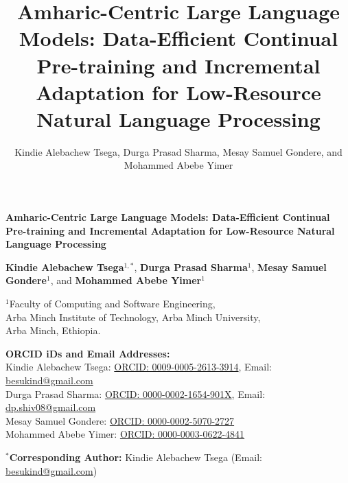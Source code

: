 \documentclass[11pt,a4paper]{article}
\title{Amharic-Centric Large Language Models: Data-Efficient Continual Pre-training and Incremental Adaptation for Low-Resource Natural Language Processing}
\author{Kindie Alebachew Tsega, Durga Prasad Sharma, Mesay Samuel Gondere, and Mohammed Abebe Yimer}
\date{}
\begin{document}
\begin{center}
    {\LARGE\bfseries Amharic-Centric Large Language Models: Data-Efficient Continual Pre-training and Incremental Adaptation for Low-Resource Natural Language Processing\par}
    
    \vspace{1.5em}
    
    {\large
    \textbf{Kindie Alebachew Tsega}$^{1,*}$, 
    \textbf{Durga Prasad Sharma}$^{1}$, 
    \textbf{Mesay Samuel Gondere}$^{1}$, and 
    \textbf{Mohammed Abebe Yimer}$^{1}$\par}
    
    \vspace{0.8em}
    
    {\normalsize
    $^{1}$Faculty of Computing and Software Engineering,\\
    Arba Minch Institute of Technology, Arba Minch University,\\
    Arba Minch, Ethiopia.\par}
    
    \vspace{1.0em}
    
    {\small\textbf{ORCID iDs and Email Addresses:}\\[0.4em]
    Kindie Alebachew Tsega: \href{https://orcid.org/0009-0005-2613-3914}{ORCID: 0009-0005-2613-3914}, Email: \href{mailto:besukind@gmail.com}{besukind@gmail.com}\\[0.25em]
    Durga Prasad Sharma: \href{https://orcid.org/0000-0002-1654-901X}{ORCID: 0000-0002-1654-901X}, Email: \href{mailto:dp.shiv08@gmail.com}{dp.shiv08@gmail.com}\\[0.25em]
    Mesay Samuel Gondere: \href{https://orcid.org/0000-0002-5070-2727}{ORCID: 0000-0002-5070-2727}\\[0.25em]
    Mohammed Abebe Yimer: \href{https://orcid.org/0000-0003-0622-4841}{ORCID: 0000-0003-0622-4841}\par}
    
    \vspace{0.8em}
    
    {\small $^{*}$\textbf{Corresponding Author:} Kindie Alebachew Tsega (Email: \href{mailto:besukind@gmail.com}{besukind@gmail.com})\par}
\end{center}
\end{document}
